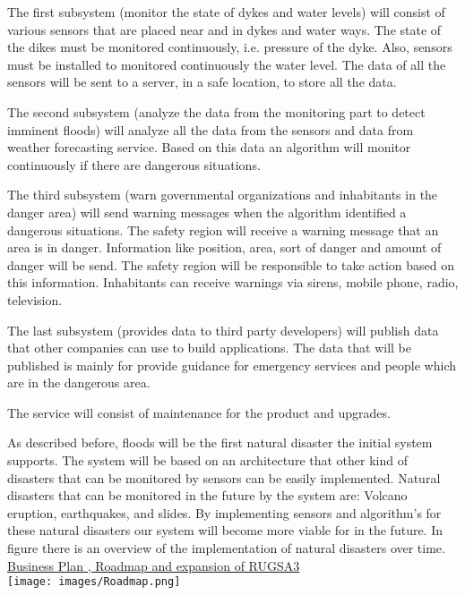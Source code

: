 The first subsystem (monitor the state of dykes and water levels) will consist of various sensors that are placed near and in dykes and water ways. The state of the dikes must be monitored continuously, i.e. pressure of the dyke. Also, sensors must be installed to monitored continuously the water level. The data of all the sensors will be sent to a server, in a safe location, to store all the data.

The second subsystem (analyze the data from the monitoring part to detect imminent floods) will analyze all the data from the sensors and data from weather forecasting service. Based on this data an algorithm will monitor continuously if there are dangerous situations.

The third subsystem (warn governmental organizations and inhabitants in the danger area) will send warning messages when the algorithm identified a dangerous situations. The safety region will receive a warning message that an area is in danger. Information like position, area, sort of danger and amount of danger will be send. The safety region will be responsible to take action based on this information. Inhabitants can receive warnings via sirens, mobile phone, radio, television. %

The last subsystem (provides data to third party developers) will publish data that other companies can use to build applications. The data that will be published is mainly for provide guidance for emergency services and people which are in the dangerous area. 

The service will consist of maintenance for the product and upgrades.

As described before, floods will be the first natural disaster the initial system supports. The system will be based on an architecture that other kind of disasters that can be monitored by sensors can be easily implemented. Natural disasters that can be monitored in the future by the system are: Volcano eruption, earthquakes, and slides. By implementing sensors and algorithm's for these natural disasters our system will become more viable for in the future. In figure 
there is an overview of the implementation of natural disasters over time. \\

\underline{Business Plan , Roadmap and expansion of RUGSA3} \\

\texttt{[image: images/Roadmap.png]}

